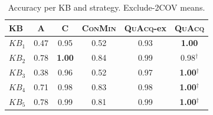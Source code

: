\begin{table}[t]
\centering
\small
\setlength{\tabcolsep}{4pt}
\begin{tabular}{lccccc}
\toprule
KB & A & C & \textsc{ConMin} & \textsc{QuAcq}-ex & \textsc{QuAcq} \tabularnewline
\midrule
$KB_{1}$ & 0.47 & 0.95 & 0.52 & 0.93 & \textbf{1.00} \tabularnewline
$KB_{2}$ & 0.78 & \textbf{1.00} & 0.84 & 0.99 & 0.98$^{\dagger}$ \tabularnewline
$KB_{3}$ & 0.38 & 0.96 & 0.52 & 0.97 & \textbf{1.00}$^{\dagger}$ \tabularnewline
$KB_{4}$ & 0.71 & 0.98 & 0.83 & 0.98 & \textbf{1.00}$^{\dagger}$ \tabularnewline
$KB_{5}$ & 0.78 & 0.99 & 0.81 & 0.99 & \textbf{1.00}$^{\dagger}$ \tabularnewline
\bottomrule
\end{tabular}
\caption{Accuracy per KB and strategy. Exclude-2COV means.}
\label{tab:app-accuracy}
\end{table}
